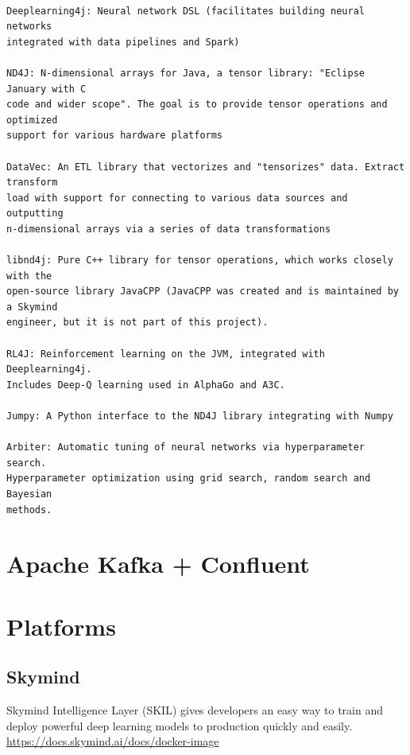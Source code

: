 \begin{verbatim}

Deeplearning4j: Neural network DSL (facilitates building neural networks
integrated with data pipelines and Spark)

ND4J: N-dimensional arrays for Java, a tensor library: "Eclipse January with C
code and wider scope". The goal is to provide tensor operations and optimized
support for various hardware platforms

DataVec: An ETL library that vectorizes and "tensorizes" data. Extract transform
load with support for connecting to various data sources and outputting
n-dimensional arrays via a series of data transformations

libnd4j: Pure C++ library for tensor operations, which works closely with the
open-source library JavaCPP (JavaCPP was created and is maintained by a Skymind
engineer, but it is not part of this project).

RL4J: Reinforcement learning on the JVM, integrated with Deeplearning4j.
Includes Deep-Q learning used in AlphaGo and A3C.

Jumpy: A Python interface to the ND4J library integrating with Numpy

Arbiter: Automatic tuning of neural networks via hyperparameter search.
Hyperparameter optimization using grid search, random search and Bayesian
methods.
\end{verbatim}


\chapter{Apache Kafka + Confluent}
\label{sec:Confluent}
\label{sec:Apache-Kafka}



\section{}

\chapter{Platforms}

\section{Skymind}

Skymind Intelligence Layer (SKIL)  gives developers an easy way to train and
deploy powerful deep learning models to production quickly and easily.
\url{https://docs.skymind.ai/docs/docker-image}

